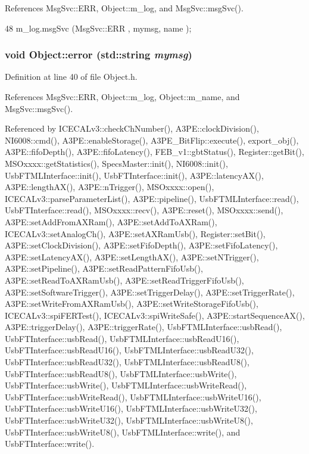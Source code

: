 References MsgSvc::ERR, Object::m\_\-log, and MsgSvc::msgSvc().


\begin{DoxyCode}
48 { m_log.msgSvc (MsgSvc::ERR     , mymsg, name ); }
\end{DoxyCode}
\hypertarget{classObject_a204a95f57818c0f811933917a30eff45}{
\subsubsection[{error}]{\setlength{\rightskip}{0pt plus 5cm}void Object::error (std::string {\em mymsg})}}
\label{classObject_a204a95f57818c0f811933917a30eff45}


Definition at line 40 of file Object.h.

References MsgSvc::ERR, Object::m\_\-log, Object::m\_\-name, and MsgSvc::msgSvc().

Referenced by ICECALv3::checkChNumber(), A3PE::clockDivision(), NI6008::cmd(), A3PE::enableStorage(), A3PE\_\-BitFlip::execute(), export\_\-obj(), A3PE::fifoDepth(), A3PE::fifoLatency(), FEB\_\-v1::gbtStatus(), Register::getBit(), MSOxxxx::getStatistics(), SpecsMaster::init(), NI6008::init(), UsbFTMLInterface::init(), UsbFTInterface::init(), A3PE::latencyAX(), A3PE::lengthAX(), A3PE::nTrigger(), MSOxxxx::open(), ICECALv3::parseParameterList(), A3PE::pipeline(), UsbFTMLInterface::read(), UsbFTInterface::read(), MSOxxxx::recv(), A3PE::reset(), MSOxxxx::send(), A3PE::setAddFromAXRam(), A3PE::setAddToAXRam(), ICECALv3::setAnalogCh(), A3PE::setAXRamUsb(), Register::setBit(), A3PE::setClockDivision(), A3PE::setFifoDepth(), A3PE::setFifoLatency(), A3PE::setLatencyAX(), A3PE::setLengthAX(), A3PE::setNTrigger(), A3PE::setPipeline(), A3PE::setReadPatternFifoUsb(), A3PE::setReadToAXRamUsb(), A3PE::setReadTriggerFifoUsb(), A3PE::setSoftwareTrigger(), A3PE::setTriggerDelay(), A3PE::setTriggerRate(), A3PE::setWriteFromAXRamUsb(), A3PE::setWriteStorageFifoUsb(), ICECALv3::spiFERTest(), ICECALv3::spiWriteSafe(), A3PE::startSequenceAX(), A3PE::triggerDelay(), A3PE::triggerRate(), UsbFTMLInterface::usbRead(), UsbFTInterface::usbRead(), UsbFTMLInterface::usbReadU16(), UsbFTInterface::usbReadU16(), UsbFTMLInterface::usbReadU32(), UsbFTInterface::usbReadU32(), UsbFTMLInterface::usbReadU8(), UsbFTInterface::usbReadU8(), UsbFTMLInterface::usbWrite(), UsbFTInterface::usbWrite(), UsbFTMLInterface::usbWriteRead(), UsbFTInterface::usbWriteRead(), UsbFTMLInterface::usbWriteU16(), UsbFTInterface::usbWriteU16(), UsbFTMLInterface::usbWriteU32(), UsbFTInterface::usbWriteU32(), UsbFTMLInterface::usbWriteU8(), UsbFTInterface::usbWriteU8(), UsbFTMLInterface::write(), and UsbFTInterface::write().


